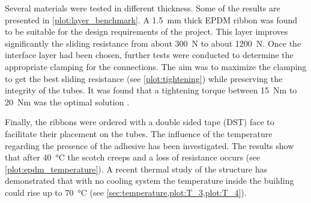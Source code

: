 Several materials were tested in different thickness. Some of the results are presented in \cref{plot:layer_benchmark}. A \SI{1.5}{\mm} thick EPDM ribbon was found to be suitable for the design requirements of the project. This layer improves significantly the sliding resistance from about \SI{300}{\newton} to about \SI{1200}{\newton}. Once the interface layer had been chosen, further tests were conducted to determine the appropriate clamping for the connections. The aim was to maximize the clamping to get the best sliding resistance (see \cref{plot:tightening}) while preserving the  integrity of the tubes. It was found that a tightening torque between \SI{15}{Nm} to \SI{20}{Nm} was the optimal solution \cite{Tayeb2015a}.

Finally, the ribbons were ordered with a double sided tape (DST) face to facilitate their placement on the tubes. The influence of the temperature regarding the presence of the adhesive has been investigated. The results show that after \SI{40}{\celsius} the scotch creeps and a loss of resistance occurs (see \cref{plot:epdm_temperature}). A recent thermal study of the structure has demonstrated that with no cooling system the temperature inside the building could rise up to \SI{70}{\celsius} (see \cref{sec:temperature,plot:T_3,plot:T_4}).



